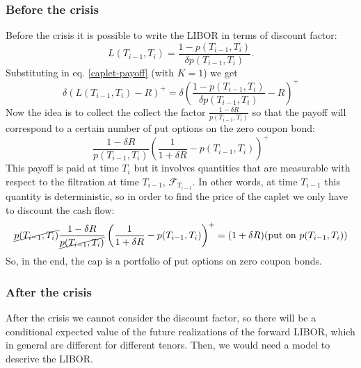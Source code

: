 \subsubsection{Before the crisis}
Before the crisis it is possible to write the LIBOR in terms of discount factor:
\begin{equation*}
    L(T_{i-1},T_i) = \frac{1-p(T_{i-1},T_i)}{\delta p(T_{i-1},T_i)}.
\end{equation*}
Substituting in eq. \eqref{caplet-payoff} (with $K=1$) we get
\begin{equation*}
    \delta(L(T_{i-1},T_i)-R)^+ = \delta\left(\frac{1-p(T_{i-1},T_i)}{\delta p(T_{i-1},T_i)}-R\right)^+
\end{equation*}
Now the idea is to collect the collect the factor $\frac{1-\delta R}{p(T_{i-1},T_i)}$ so that the payoff will correspond to a certain number of put options on the zero coupon bond:
\begin{equation}
    \frac{1-\delta R}{p(T_{i-1},T_i)}\left(\frac{1}{1+\delta R} - p(T_{i-1},T_i)\right)^+
\end{equation}
This payoff is paid at time $T_i$ but it involves quantities that are measurable with respect to the filtration at time $T_{i-1}$, $\mathcal{F}_{T_{i-1}}$. In other words, at time $T_{i-1}$ this quantity is deterministic, so in order to find the price of the caplet we only have to discount the cash flow:
\begin{equation}
    \cancel{p(T_{i-1},T_i)}\frac{1-\delta R}{\cancel{p(T_{i-1},T_i)}}\left(\frac{1}{1+\delta R}-p(T_{i-1},T_i)\right)^+ = (1+\delta R)(\text{put on } p(T_{i-1},T_i))
\end{equation}
So, in the end, the cap is a portfolio of put options on zero coupon bonds. %

\subsubsection{After the crisis}
After the crisis we cannot consider the discount factor, so there will be a conditional expected value of the future realizations of the forward LIBOR, which in general are different for different tenors. Then, we would need a model to descrive the LIBOR.


